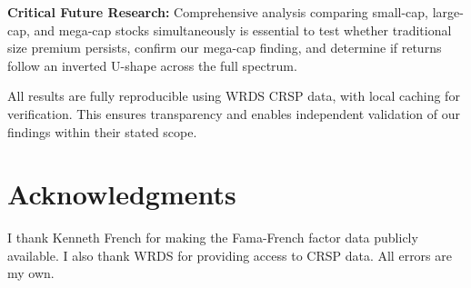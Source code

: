 \documentclass[10pt,letterpaper]{article}
\begin{document}
\textbf{Critical Future Research:} Comprehensive analysis comparing small-cap, large-cap, and mega-cap stocks simultaneously is essential to test whether traditional size premium persists, confirm our mega-cap finding, and determine if returns follow an inverted U-shape across the full spectrum.

All results are fully reproducible using WRDS CRSP data, with local caching for verification. This ensures transparency and enables independent validation of our findings within their stated scope.

\clearpage
\section*{Acknowledgments}

I thank Kenneth French for making the Fama-French factor data publicly available. I also thank WRDS for providing access to CRSP data. All errors are my own.

\nolinenumbers


\end{document}
